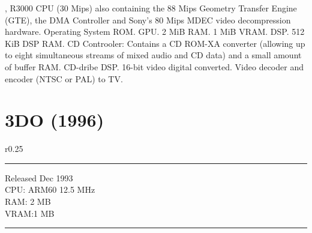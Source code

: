 \par
{}, R3000 CPU (30 Mips) also containing the 88 Mips Geometry Transfer Engine (GTE), the DMA Controller and Sony's 80 Mips MDEC video decompression hardware.
 Operating System ROM.
 GPU.
 2 MiB RAM.
 1 MiB VRAM.
 DSP.
 512 KiB DSP RAM.
 CD Controoler: Contains a CD ROM-XA converter (allowing up to eight simultaneous streams of mixed audio and CD data) and a small amount of buffer RAM.
 CD-dribe DSP.
 16-bit video digital converted.
 Video decoder and encoder (NTSC or PAL) to TV.









\section{3DO (1996)}
\begin{wrapfigure}[22]{r}{0.25\textwidth}{\centering {}}
\hrule 
   Released Dec 1993\\
   CPU: ARM60 12.5 MHz\\
   RAM: 2 MB\\
   VRAM:1 MB\\
\hrule 
\end{wrapfigure}

